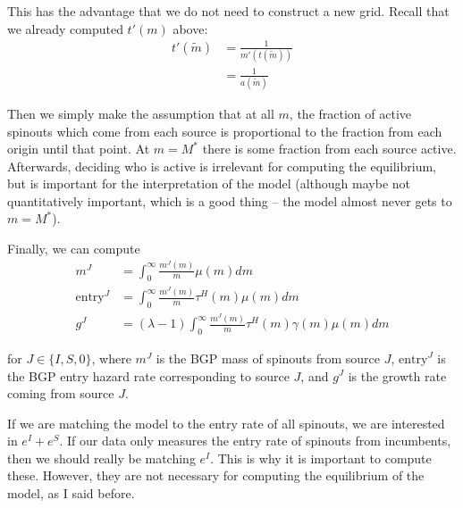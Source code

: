 \documentclass[12pt,english]{article}
\theoremstyle{remark}
\begin{document}
This has the advantage that we do not need to construct a new grid. Recall that we already computed $t'(m)$ above:
\begin{align*}
	t'(\tilde{m}) &= \frac{1}{m'(t(\tilde{m}))} \\ 
	 			  &= \frac{1}{a(\tilde{m})}
\end{align*}


Then we simply make the assumption that at all $m$, the fraction of active spinouts which come from each source is proportional to the fraction from each origin until that point. At $m = M^*$ there is some fraction from each source active. Afterwards, deciding who is active is irrelevant for computing the equilibrium, but is important for the interpretation of the model (although maybe not quantitatively important, which is a good thing -- the model almost never gets to $m = M^*$). 

Finally, we can compute
\begin{align*}
	m^J &= \int_0^{\infty} \frac{m^J(m)}{m} \mu(m) dm \\
	\textrm{entry}^J &= \int_0^{\infty} \frac{m^J(m)}{m} \tau^H(m) \mu(m) dm \\
	g^J &= (\lambda - 1) \int_0^{\infty} \frac{m^J(m)}{m} \tau^H(m) \gamma(m) \mu(m) dm
\end{align*}

for $J \in \{I,S,0\}$, where $m^J$ is the BGP mass of spinouts from source $J$, $\textrm{entry}^J$ is the BGP entry hazard rate corresponding to source $J$, and $g^J$ is the growth rate coming from source $J$.

If we are matching the model to the entry rate of all spinouts, we are interested in $e^I + e^S$. If our data only measures the entry rate of spinouts from incumbents, then we should really be matching $e^I$. This is why it is important to compute these. However, they are not necessary for computing the equilibrium of the model, as I said before.  
\end{document}
